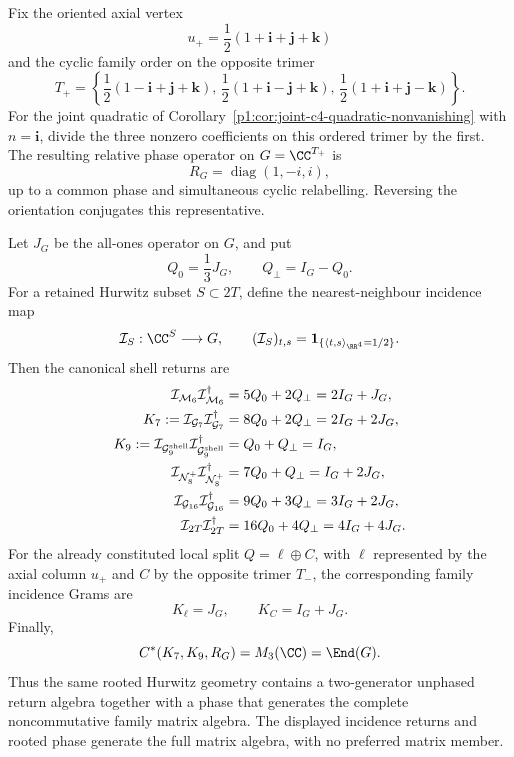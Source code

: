 \documentclass[11pt]{article}
\begin{document}
\begin{theorem}
\label{p1:thm:v556-rooted-hurwitz-family-return-algebra}
Fix the oriented axial vertex
\[
 u_+=\frac12(1+\mathbf i+\mathbf j+\mathbf k)
\]
and the cyclic family order on the opposite trimer
\[
 T_+=\left\{
 \frac12(1-\mathbf i+\mathbf j+\mathbf k),\,
 \frac12(1+\mathbf i-\mathbf j+\mathbf k),\,
 \frac12(1+\mathbf i+\mathbf j-\mathbf k)
 \right\}.
\]
For the joint quadratic of
Corollary~\ref{p1:cor:joint-c4-quadratic-nonvanishing} with
\(n=\mathbf i\), divide the three nonzero coefficients on this ordered
trimer by the first.  The resulting relative phase operator on
\(G=\CC^{T_+}\) is
\begin{equation}
\label{p1:eq:v556-rooted-family-phase}
 R_G=\operatorname{diag}(1,-i,i),
\end{equation}
up to a common phase and simultaneous cyclic relabelling.  Reversing the
orientation conjugates this representative.

Let \(J_G\) be the all-ones operator on \(G\), and put
\[
 Q_0=\frac13J_G,\qquad Q_\perp=I_G-Q_0.
\]
For a retained Hurwitz subset \(S\subset 2T\), define the nearest-neighbour
incidence map
\[
 \mathcal I_S:\CC^S\longrightarrow G,
 \qquad
 (\mathcal I_S)_{t,s}
 =\mathbf 1_{\{\langle t,s\rangle_{\RR^4}=1/2\}}.
\]
Then the canonical shell returns are
\begin{align}
 \mathcal I_{\mathcal M_6}\mathcal I_{\mathcal M_6}^\dagger
   &=5Q_0+2Q_\perp=2I_G+J_G,\nonumber\\
 K_7:=\mathcal I_{\mathcal G_7}\mathcal I_{\mathcal G_7}^\dagger
   &=8Q_0+2Q_\perp=2I_G+2J_G,\label{p1:eq:v556-shell-trimer-grams}\\
 K_9:=\mathcal I_{\mathcal G_9^{\rm shell}}
       \mathcal I_{\mathcal G_9^{\rm shell}}^\dagger
   &=Q_0+Q_\perp=I_G,\nonumber\\
 \mathcal I_{\mathcal N_8^+}\mathcal I_{\mathcal N_8^+}^\dagger
   &=7Q_0+Q_\perp=I_G+2J_G,\nonumber\\
 \mathcal I_{\mathcal G_{16}}\mathcal I_{\mathcal G_{16}}^\dagger
   &=9Q_0+3Q_\perp=3I_G+2J_G,\nonumber\\
 \mathcal I_{2T}\mathcal I_{2T}^\dagger
   &=16Q_0+4Q_\perp=4I_G+4J_G.\nonumber
\end{align}
For the already constituted local split
\(Q=\ell\oplus C\), with \(\ell\) represented by the axial column \(u_+\)
and \(C\) by the opposite trimer \(T_-\), the corresponding family
incidence Grams are
\begin{equation}
\label{p1:eq:v556-local-q-family-grams}
 K_\ell=J_G,
 \qquad
 K_C=I_G+J_G.
\end{equation}
Finally,
\begin{equation}
\label{p1:eq:v556-full-family-algebra}
 C^*(K_7,K_9,R_G)=M_3(\CC)=\End(G).
\end{equation}
Thus the same rooted Hurwitz geometry contains a two-generator unphased
return algebra together with a phase that generates the complete
noncommutative family matrix algebra.  The displayed incidence returns and rooted phase generate
the full matrix algebra, with no preferred matrix member.
\end{theorem}
\end{document}
